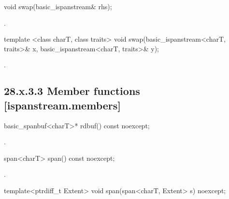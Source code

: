 \documentclass[ebook,11pt,article]{memoir}
\begin{document}
\begin{itemdecl}
void swap(basic_ispanstream& rhs);
\end{itemdecl}

\begin{itemdescr}
\pnum
\effects 
{}.
\end{itemdescr}


\begin{itemdecl}
template <class charT, class traits>
  void swap(basic_ispanstream<charT, traits>& x,
            basic_ispanstream<charT, traits>& y);
\end{itemdecl}

\begin{itemdescr}
\pnum
\effects {}.
\end{itemdescr}

\subsection{28.x.3.3 Member functions [ispanstream.members]}
\label{ispanstream.members}

\begin{itemdecl}
basic_spanbuf<charT>* rdbuf() const noexcept;
\end{itemdecl}

\begin{itemdescr}
\pnum
\returns
{}.
\end{itemdescr}

\begin{itemdecl}
span<charT> span() const noexcept;
\end{itemdecl}

\begin{itemdescr}
\pnum
\returns
{}.
\end{itemdescr}

\begin{itemdecl}
template<ptrdiff_t Extent>
void span(span<charT, Extent> s) noexcept;
\end{itemdecl}
\end{document}
